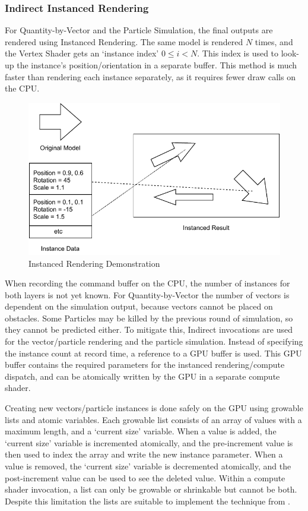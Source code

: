 \subsubsection{Indirect Instanced Rendering}
For Quantity-by-Vector and the Particle Simulation, the final outputs are rendered using Instanced Rendering.%
The same model is rendered $N$ times, and the Vertex Shader gets an `instance index' $0 \le i < N$.
This index is used to look-up the instance's position/orientation in a separate buffer.
This method is much faster than rendering each instance separately, as it requires fewer draw calls on the CPU.
\begin{figure}
    \centering
    \includegraphics{Ch42Design/figures/FinalReport_InstancedRendering.pdf}
    \caption{Instanced Rendering Demonstration}
    \label{fig:InstancedRendering}
\end{figure}

When recording the command buffer on the CPU, the number of instances for both layers is not yet known.
For Quantity-by-Vector the number of vectors is dependent on the simulation output, because vectors cannot be placed on obstacles.
Some Particles may be killed by the previous round of simulation, so they cannot be predicted either.
To mitigate this, Indirect invocations are used for the vector/particle rendering and the particle simulation.
Instead of specifying the instance count at record time, a reference to a GPU buffer is used.
This GPU buffer contains the required parameters for the instanced rendering/compute dispatch, and can be atomically written by the GPU in a separate compute shader.

Creating new vectors/particle instances is done safely on the GPU using growable lists and atomic variables.
Each growable list consists of an array of values with a maximum length, and a `current size' variable.
When a value is added, the `current size' variable is incremented atomically, and the pre-increment value is then used to index the array and write the new instance parameter.
When a value is removed, the `current size' variable is decremented atomically, and the post-increment value can be used to see the deleted value.
Within a compute shader invocation, a list can only be growable or shrinkable but cannot be both.
Despite this limitation the lists are suitable to implement the technique from \cite{WickedEngineParticles}.

